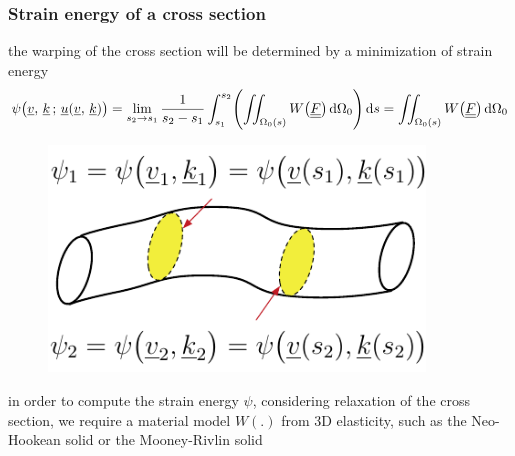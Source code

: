 \begin{frame}
  \frametitle{Strain energy of a cross section}

  the warping of the cross section will be determined by a minimization of strain energy
  \begin{displaymath}
    \psi \bigl( \underline{v} , \, \underline{k} \, ; \, \underline{u}(\underline{v} , \, \underline{k}) \bigr) =
    \lim_{s_2 \to s_1} \frac{1}{s_2 - s_1} \int_{s_1}^{s_2}  \Biggl( \iint_{\Omega_0(s)} W \bigl( \doubleunderline{F} \bigr) \dif \Omega_0 \Biggr) \dif s =
    \iint_{\Omega_0(s)} W \bigl( \doubleunderline{F} \bigr) \dif \Omega_0
  \end{displaymath}

  \vspace{0.3em}
  \begin{figure}
    \centering
    \includegraphics[width=10cm, keepaspectratio=true]{sections/cosserat_rods/images/LocalEnergy}
  \end{figure}
  
  \vspace{0.5em}
  in order to compute the strain energy $\psi$, considering relaxation of the cross section,
  we require a material model $W(.)$ from 3D elasticity, such as the Neo-Hookean solid or the Mooney-Rivlin solid  
  
\end{frame}


